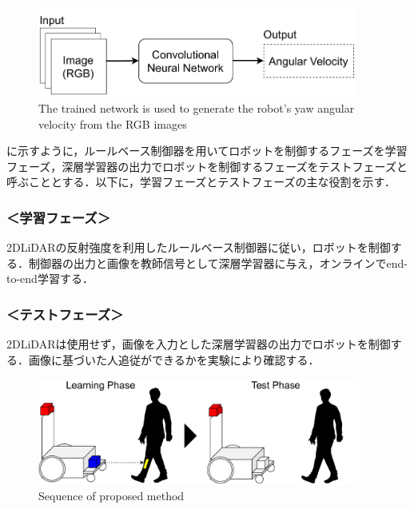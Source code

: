   \begin{figure}[h]
    \centering
    \includegraphics[height=3cm] {images/pdf/RobotGuidance_simple_system}
    \captionsetup{justification=raggedright} %
    \caption{The trained network is used to generate the robot's yaw angular velocity from the RGB images}
    \label{Fig:RobotGuidance_simple_system}
  \end{figure}

  に示すように，ルールベース制御器を用いてロボットを制御するフェーズを学習フェーズ，深層学習器の出力でロボットを制御するフェーズをテストフェーズと呼ぶこととする．以下に，学習フェーズとテストフェーズの主な役割を示す．

  \subsubsection*{＜学習フェーズ＞}
  2DLiDARの反射強度を利用したルールベース制御器に従い，ロボットを制御する．制御器の出力と画像を教師信号として深層学習器に与え，オンラインでend-to-end学習する．
  
  \subsubsection*{＜テストフェーズ＞}
  2DLiDARは使用せず，画像を入力とした深層学習器の出力でロボットを制御する．画像に基づいた人追従ができるかを実験により確認する．

  \begin{figure}[h]
    \centering
    \includegraphics[height=3.5cm] {images/pdf/RobotGuidance_all_system}
    \captionsetup{justification=raggedright} %
    \caption{Sequence of proposed method}
    \label{Fig:RobotGuidance_all_system}
  \end{figure}

\newpage
